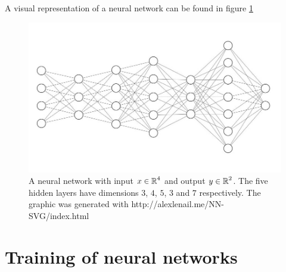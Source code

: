 A visual representation of a neural network can be found in figure \ref{visual_nn}

\begin{figure}[H]
\begin{center}
   \begin{minipage}[b]{\linewidth}
      \includegraphics[width=\linewidth]{neural_net}
      \caption{A neural network with input $x\in \operatorname{\mathbb{R}}^4$ and output $y\in\operatorname{\mathbb{R}}^2$. The five hidden layers have dimensions $3$, $4$, $5$, $3$ and $7$ respectively. The graphic was generated with http://alexlenail.me/NN-SVG/index.html}\label{visual_nn}
	\end{minipage}
\end{center}
\end{figure}

\section{Training of neural networks}
